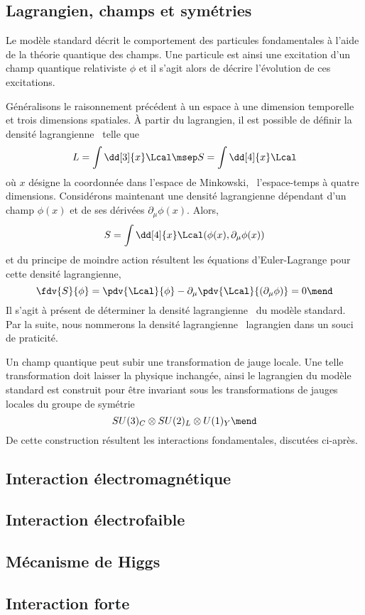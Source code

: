 \subsection{Lagrangien, champs et symétries}
Le modèle standard décrit le comportement des particules fondamentales à l'aide de la théorie quantique des champs. Une particule est ainsi une excitation d'un champ quantique relativiste $\phi$ et il s'agit alors de décrire l'évolution de ces excitations.
\par Généralisons le raisonnement précédent à un espace à une dimension temporelle et trois dimensions spatiales.
À partir du lagrangien, il est possible de définir la densité lagrangienne \Lcal\ telle que
\begin{equation}
L = \int\dd[3]{x}\Lcal
\msep
S = \int\dd[4]{x}\Lcal
\end{equation}
où $x$ désigne la coordonnée dans l'espace de Minkowski, \ie\ l'espace-temps à quatre dimensions.
Considérons maintenant une densité lagrangienne dépendant d'un champ $\phi(x)$ et de ses dérivées $\partial_\mu\phi(x)$.
Alors,
\begin{equation}
S = \int\dd[4]{x}\Lcal(\phi(x),\partial_\mu\phi(x))
\end{equation}
et du principe de moindre action résultent les équations d'Euler-Lagrange pour cette densité lagrangienne,
\begin{equation}
\fdv{S}{\phi}
=
\pdv{\Lcal}{\phi} - \partial_\mu\pdv{\Lcal}{(\partial_\mu\phi)} = 0
\mend
\end{equation}
Il s'agit à présent de déterminer la densité lagrangienne \Lcal\ du modèle standard.
Par la suite, nous nommerons la densité lagrangienne \Lcal\ \og lagrangien \fg{} dans un souci de praticité.
\par Un champ quantique peut subir une transformation de jauge locale. Une telle transformation doit laisser la physique inchangée, ainsi le lagrangien du modèle standard est construit pour être invariant sous les transformations de jauges locales du groupe de symétrie
\begin{equation}
SU(3)_C \otimes SU(2)_L \otimes U(1)_Y
\mend
\end{equation}
De cette construction résultent les interactions fondamentales, discutées ci-après.

\subsection{Interaction électromagnétique}
\subsection{Interaction électrofaible}
\subsection{Mécanisme de Higgs}
\subsection{Interaction forte}
